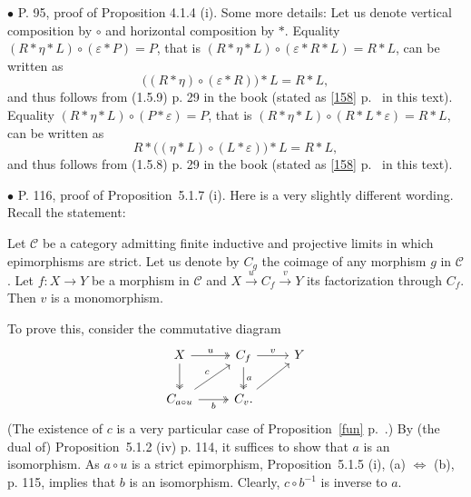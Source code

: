 \documentclass[12pt]{article}
\theoremstyle{remark}%
\newcommand{\bu}{\bullet}
\newcommand{\n}{\noindent}
\newcommand{\C}{\mathcal C}
\newcommand{\e}{\varepsilon}
\newcommand{\xr}{\xrightarrow}
\newcommand{\cd}{commutative diagram}
\newcommand{\pr}{Proposition}
\begin{document}

\n$\bu$ P. 95, proof of Proposition 4.1.4 (i). Some more details: Let us denote vertical composition by $\circ$ and horizontal composition by $*$. Equality $(R*\eta*L)\circ(\e*P)=P$, that is $(R*\eta*L)\circ(\e*R*L)=R*L$, can be written as 
$$
\Big((R*\eta)\circ(\e*R)\Big)*L=R*L,
$$ 
and thus follows from (1.5.9) p. 29 in the book (stated as \eqref{158} p.~\pageref{158} in this text). Equality $(R*\eta*L)\circ(P*\e)=P$, that is $(R*\eta*L)\circ(R*L*\e)=R*L$, can be written as 
$$
R*\Big((\eta*L)\circ(L*\e)\Big)*L=R*L,
$$ 
and thus follows from (1.5.8) p. 29 in the book (stated as \eqref{158} p.~\pageref{158} in this text). 


\n$\bu$ P. 116, proof of \pr\ 5.1.7 (i). Here is a very slightly different wording. Recall the statement: 

Let $\C$ be a category admitting finite inductive and projective limits in which epimorphisms are strict. Let us denote by $C_g$ the coimage of any morphism $g$ in $\C$. Let $f:X\to Y$ be a morphism in $\C$ and $X\xr u C_f\xr v Y$ its factorization through $C_f$. Then $v$ is a monomorphism. 

To prove this, consider the \cd
$$
\begin{tikzcd}
X\ar[two heads]{d}\ar[two heads]{r}{u}&C_f\ar[two heads]{d}{a}\ar{r}{v}&Y\\
C_{a\circ u}\ar{ur}{c}\ar[two heads]{r}[swap]{b}&C_v.\ar{ru}
\end{tikzcd}
$$ 
(The existence of $c$ is a very particular case of \pr\ \ref{fun} p.~\pageref{fun}.) By (the dual of) \pr\ 5.1.2 (iv) p. 114, it suffices to show that $a$ is an isomorphism. As $a\circ u$ is a strict epimorphism, \pr\ 5.1.5 (i), (a) $\iff$ (b), p. 115, implies that $b$ is an isomorphism. Clearly, $c\circ b^{-1}$ is inverse to $a$.  

\end{document}
